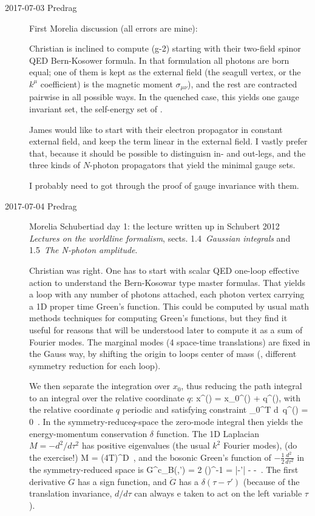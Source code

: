\begin{description}

\item[2017-07-03 Predrag] First Morelia discussion (all errors are mine):

Christian is inclined to compute (g-2) starting with their two-field
spinor QED Bern-Kosower formula. In that formulation all photons are born equal;
one of them is kept as the external field (the seagull vertex, or the $k^\mu$
coefficient) is the
magnetic moment $\sigma_{\mu\nu}$), and the rest are contracted pairwise in
all possible ways. In the quenched case, this yields one gauge invariant set,
the self-energy set of .

James would like to start with their electron propagator in constant
external field, and keep the term linear in the external field. I vastly
prefer that, because it should be possible to distinguisn in- and
out-legs, and the three kinds of $N$-photon propagators that yield the
minimal gauge sets.

I probably need to got through the proof of gauge invariance with them.

\item[2017-07-04 Predrag] Morelia Schubertiad day 1:
the lecture written up in Schubert 2012 {\em Lectures on
the worldline formalism}, sects. 1.4~{\em Gaussian integrals} and
1.5~{\em The N-photon amplitude}.

Christian was right. One has to start with scalar QED one-loop effective
action to understand the Bern-Kosowar type master formulas. That yields a
loop with any number of photons attached, each photon vertex carrying a
1D proper time Green's function. This could be computed by usual math
methods techniques for computing Green's functions, but they find it
useful for reasons that will be understood later to compute it as a sum
of Fourier modes. The marginal modes (4 space-time translations) are fixed
in the Gauss way, by shifting the origin to loops center of mass (\ie,
different symmetry reduction for each loop).

We then separate the integration over $x_0$, thus reducing the path integral
to an integral over the relative coordinate $q$:
\beq
x^{\mu}(\tau) = x_0^{\mu}(\tau) + q^{\mu}(\tau),
with  the relative coordinate $q$ periodic and satisfying constraint
\beq
\int_0^T d\tau\, q^{\mu}(\tau) = 0
\,.
In the symmetry-reduce$q$-space the zero-mode integral then yields
the energy-momentum conservation $\delta$ function. The 1D Laplacian
$M=-d^2/d\tau^2$ has positive eigenvalues (the usual $k^2$ Fourier modes),
(do the exercise!)
\beq
\det M = (4T)^D
\,,
and the bosonic Green's function of $-\frac{1}{2}\frac{d^2~}{d\tau^2}$ in
the symmetry-reduced space is
\beq
G^c_B(\tau,\tau')
= 2 \bra{\tau}\left(\right)^{-1}
= |\tau-\tau'| -  - 
\,.
The first derivative $\dot{G}$  has a sign function, and $\ddot{G}$ has a
$\delta(\tau-\tau')$ (because of the translation invariance, $d/d\tau$
can always e taken to act on the left variable $\tau$).


\end{description}
